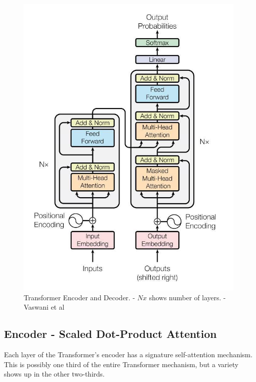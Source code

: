 \begin{figure}[H]
	\begin{center}
		
		
		\includegraphics[scale=1.5]{diagram-mat04}
	\end{center}
	\caption[Transformer Encoder and Decoder]{Transformer Encoder and Decoder. - $Nx$ shows number of layers. - Vaswani et al \cite{Vaswani2017AttentionIA}}
	
	
\end{figure}

\subsection{Encoder - Scaled Dot-Product Attention}

Each layer of the Transformer's encoder has a signature self-attention mechanism. This is possibly one third of the entire Transformer mechanism, but a variety shows up in the other two-thirds. 


